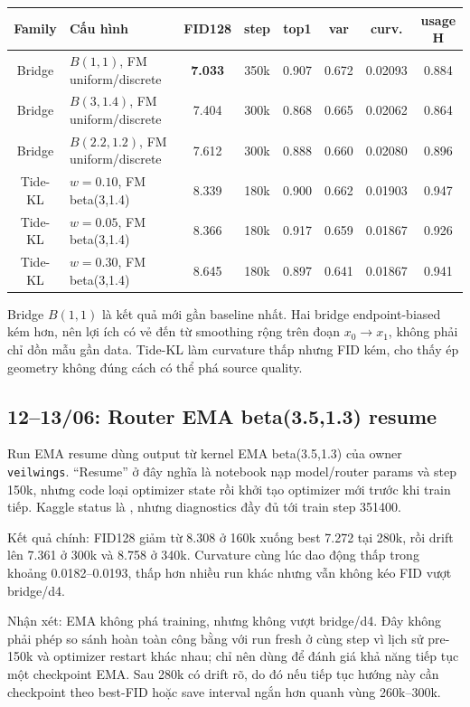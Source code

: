 \documentclass[11pt,a4paper]{article}
\newcommand{\run}[1]{{\small\nolinkurl{#1}}}
\newcommand{\metric}[1]{\texttt{\small\detokenize{#1}}}
\newcommand{\best}[1]{\textbf{#1}}
\begin{document}
\begin{center}
\small
\setlength{\tabcolsep}{2.5pt}
\begin{tabularx}{\linewidth}{@{}c Y c c c c c c@{}}
\toprule
\textbf{Family} & \textbf{Cấu hình} & \textbf{FID128} & \textbf{step} & \textbf{top1} & \textbf{var} & \textbf{curv.} & \textbf{usage H}\\
\midrule
Bridge & \(B(1,1)\), FM uniform/discrete & \best{7.033} & 350k & 0.907 & 0.672 & 0.02093 & 0.884\\
Bridge & \(B(3,1.4)\), FM uniform/discrete & 7.404 & 300k & 0.868 & 0.665 & 0.02062 & 0.864\\
Bridge & \(B(2.2,1.2)\), FM uniform/discrete & 7.612 & 300k & 0.888 & 0.660 & 0.02080 & 0.896\\
Tide-KL & \(w=0.10\), FM beta(3,1.4) & 8.339 & 180k & 0.900 & 0.662 & 0.01903 & 0.947\\
Tide-KL & \(w=0.05\), FM beta(3,1.4) & 8.366 & 180k & 0.917 & 0.659 & 0.01867 & 0.926\\
Tide-KL & \(w=0.30\), FM beta(3,1.4) & 8.645 & 180k & 0.897 & 0.641 & 0.01867 & 0.941\\
\bottomrule
\end{tabularx}
\end{center}

Bridge \(B(1,1)\) là kết quả mới gần baseline nhất. Hai bridge endpoint-biased kém hơn, nên lợi ích có vẻ đến từ smoothing rộng trên đoạn \(x_0 \rightarrow x_1\), không phải chỉ dồn mẫu gần data. Tide-KL làm curvature thấp nhưng FID kém, cho thấy ép geometry không đúng cách có thể phá source quality.

\subsection{12--13/06: Router EMA beta(3.5,1.3) resume}

Run EMA resume dùng output từ kernel EMA beta(3.5,1.3) của owner \run{veilwings}. ``Resume'' ở đây nghĩa là notebook nạp model/router params và step 150k, nhưng code loại optimizer state rồi khởi tạo optimizer mới trước khi train tiếp. Kaggle status là \metric{CANCEL\_ACKNOWLEDGED}, nhưng diagnostics đầy đủ tới train step 351400.

Kết quả chính: FID128 giảm từ 8.308 ở 160k xuống best 7.272 tại 280k, rồi drift lên 7.361 ở 300k và 8.758 ở 340k. Curvature cùng lúc dao động thấp trong khoảng 0.0182--0.0193, thấp hơn nhiều run khác nhưng vẫn không kéo FID vượt bridge/d4.

Nhận xét: EMA không phá training, nhưng không vượt bridge/d4. Đây không phải phép so sánh hoàn toàn công bằng với run fresh ở cùng step vì lịch sử pre-150k và optimizer restart khác nhau; chỉ nên dùng để đánh giá khả năng tiếp tục một checkpoint EMA. Sau 280k có drift rõ, do đó nếu tiếp tục hướng này cần checkpoint theo best-FID hoặc save interval ngắn hơn quanh vùng 260k--300k.
\end{document}
